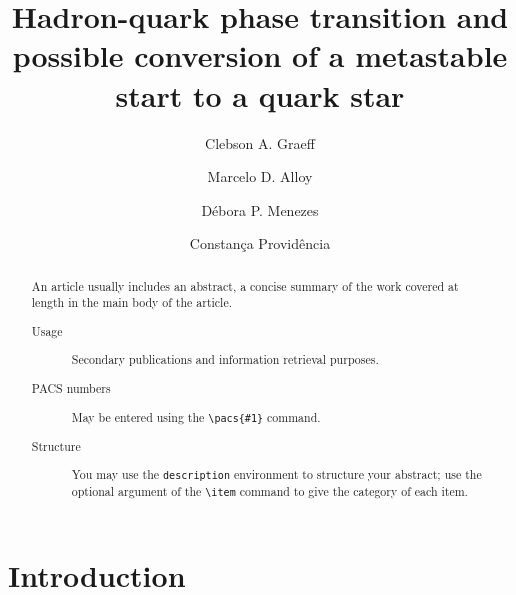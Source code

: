 \documentclass[prc, reprint, amsmath, floatfix, linenumbers,10pt]{revtex4-1}
\begin{document}

%
%

\title{Hadron-quark phase transition and possible conversion of a metastable start to a quark star}

\author{Clebson A. Graeff}

\author{Marcelo D. Alloy}
\email{}

\author{Débora P. Menezes}

\author{Constança Providência}
\email{}

\begin{abstract}
An article usually includes an abstract, a concise summary of the work
covered at length in the main body of the article. 
\begin{description}
\item[Usage]
Secondary publications and information retrieval purposes.
\item[PACS numbers]
May be entered using the \verb+\pacs{#1}+ command.
\item[Structure]
You may use the \texttt{description} environment to structure your abstract;
use the optional argument of the \verb+\item+ command to give the category of each item. 
\end{description}
\end{abstract}




\maketitle

%
%

\section{Introduction}
\end{document}
